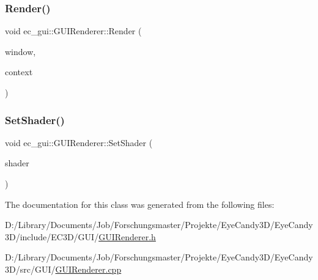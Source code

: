 \mbox{\label{classec__gui_1_1_g_u_i_renderer_a653246abd1cd356545cce1db75b0ed9c}} 
\subsubsection{\texorpdfstring{Render()}{Render()}\hspace{0.1cm}{\footnotesize\ttfamily [5/5]}}
{\footnotesize\ttfamily void ec\+\_\+gui\+::\+G\+U\+I\+Renderer\+::\+Render (\begin{DoxyParamCaption}\item[{\mbox{\hyperlink{classec__gui_1_1_window}{Window}} $\ast$}]{window,  }\item[{\mbox{\hyperlink{classec__gui_1_1_g_u_i_rendering_context}{G\+U\+I\+Rendering\+Context}} \&}]{context }\end{DoxyParamCaption})}

\mbox{\label{classec__gui_1_1_g_u_i_renderer_a12195634fd49c0475ee798cdb1d474c0}} 
\subsubsection{\texorpdfstring{Set\+Shader()}{SetShader()}}
{\footnotesize\ttfamily void ec\+\_\+gui\+::\+G\+U\+I\+Renderer\+::\+Set\+Shader (\begin{DoxyParamCaption}\item[{\mbox{\hyperlink{classec_1_1_shader}{ec\+::\+Shader}} $\ast$}]{shader }\end{DoxyParamCaption})}



The documentation for this class was generated from the following files\+:\begin{DoxyCompactItemize}
\item 
D\+:/\+Library/\+Documents/\+Job/\+Forschungsmaster/\+Projekte/\+Eye\+Candy3\+D/\+Eye\+Candy3\+D/include/\+E\+C3\+D/\+G\+U\+I/\mbox{\hyperlink{_g_u_i_renderer_8h}{G\+U\+I\+Renderer.\+h}}\item 
D\+:/\+Library/\+Documents/\+Job/\+Forschungsmaster/\+Projekte/\+Eye\+Candy3\+D/\+Eye\+Candy3\+D/src/\+G\+U\+I/\mbox{\hyperlink{_g_u_i_renderer_8cpp}{G\+U\+I\+Renderer.\+cpp}}\end{DoxyCompactItemize}
